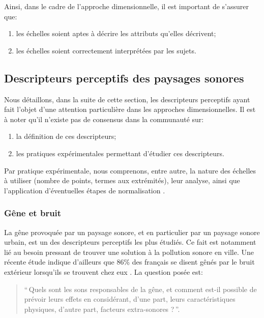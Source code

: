 {\begin{itemize}
\end{itemize}

Ainsi, dans le cadre de l'approche dimensionnelle, il est important de s'assurer que:

\begin{enumerate}
\item les échelles soient aptes à décrire les attributs qu'elles décrivent;
\item les échelles soient correctement interprétées par les sujets.
\end{enumerate}

\subsection{Descripteurs perceptifs des paysages sonores}
\label{sec:descripteursPercetifs}

Nous détaillons, dans la suite de cette section, les descripteurs perceptifs ayant fait l'objet d'une attention particulière dans les approches dimensionnelles. Il est à noter qu'il n'existe pas de consensus dans la communauté sur:

\begin{enumerate}
\item la définition de ces descripteurs; 
\item les pratiques expérimentales permettant d'étudier ces descripteurs.
\end{enumerate}

Par pratique expérimentale, nous comprenons, entre autre, la nature des échelles à utiliser (nombre de points, termes aux extrémités), leur analyse, ainsi que l'application d'éventuelles étapes de normalisation \citep{aletta2016soundscape}.

\subsubsection{Gêne et bruit}

La gêne provoquée par un paysage sonore, et en particulier par un paysage sonore urbain, est un des descripteurs perceptifs les plus étudiés. Ce fait est notamment lié au besoin pressant de trouver une solution à la pollution sonore en ville. Une récente étude indique d'ailleurs que 86\% des français se disent gênés par le bruit extérieur lorsqu'ils se trouvent chez eux \citep{noiseFrench}. La question posée est: \\

\begin{quote}
``\,Quels sont les sons responsables de la gêne, et comment est-il possible de prévoir leurs effets en considérant, d'une part, leurs caractéristiques physiques, d'autre part,   facteurs extra-sonores ?\,''.
\end{quote}

}
